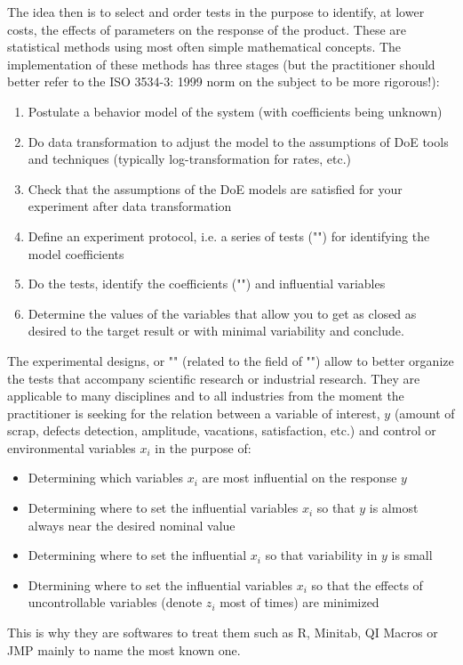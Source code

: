 	The idea then is to select and order tests in the purpose to identify, at lower costs, the effects of parameters on the response of the product. These are statistical methods using most often simple mathematical concepts. The implementation of these methods has three stages (but the practitioner should better refer to the ISO 3534-3: 1999 norm on the subject to be more rigorous!):
	\begin{enumerate}
		\item Postulate a behavior model of the system (with coefficients being unknown)
		
		\item Do data transformation to adjust the model to the assumptions of DoE tools and techniques (typically log-transformation for rates, etc.)
		
		\item Check that the assumptions of the DoE models are satisfied for your experiment after data transformation
		
		\item Define an experiment protocol, i.e. a series of tests ("") for identifying the model coefficients
		
		\item Do the tests, identify the coefficients ("") and influential variables
		
		\item Determine the values of the variables that allow you to get as closed as desired to the target result or with minimal variability and conclude.
	\end{enumerate}
	The experimental designs, or "" (related to the field of "") allow to better organize the tests that accompany scientific research or industrial research. They are applicable to many disciplines and to all industries from the moment the practitioner is seeking for the relation between a variable of interest, $y$ (amount of scrap, defects detection, amplitude, vacations, satisfaction, etc.) and control or environmental variables $x_i$ in the purpose of:
	\begin{itemize}
		\item Determining which variables $x_i$ are most influential on the response $y$
		
		\item Determining where to set the influential variables $x_i$ so that $y$ is almost always near the desired nominal value
		
		\item Determining where to set the influential $x_i$ so that variability in $y$ is small
		
		\item Dtermining where to set the influential variables $x_i$ so that the effects of uncontrollable variables (denote $z_i$ most of times) are minimized
	\end{itemize}
	This is why they are softwares to treat them such as R, Minitab, QI Macros or JMP mainly to name the most known one.
	
